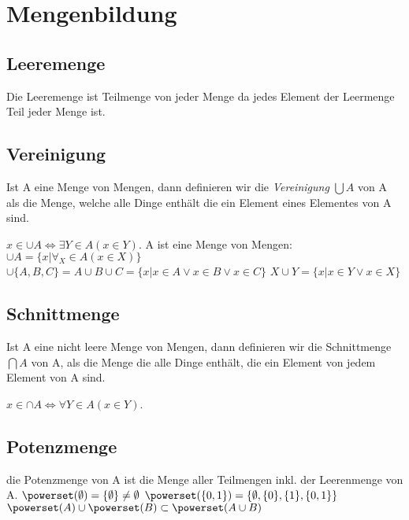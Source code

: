 \section{Mengenbildung}
\subsection{Leeremenge}
Die Leeremenge ist Teilmenge von jeder Menge da jedes Element der Leermenge Teil jeder Menge ist.
\subsection{Vereinigung}
Ist A eine Menge von Mengen, dann definieren wir die \emph{Vereinigung} \( \bigcup A\) von A als die Menge, welche alle Dinge enthält die ein Element eines Elementes von A sind.
\par \hspace*{10mm} \( x \in \cup A \Leftrightarrow \exists Y \in A(x \in Y) \).
\newline A ist eine Menge von Mengen: \newline
\hspace*{10mm}\( \cup A = \{x | \forall_X \in A (x \in X)\}\) \newline
\hspace*{10mm}\( \cup \{A, B, C\} = A \cup B \cup C = \{x|x \in A \vee x \in B \vee x \in C\}\) \newline
\hspace*{10mm}\( X \cup Y = \{ x | x \in Y \vee x \in X \}\)
\subsection{Schnittmenge}
Ist A eine nicht leere Menge von Mengen, dann definieren wir die Schnittmenge \(\bigcap A\) von A, als die Menge die alle Dinge enthält, die ein Element von jedem Element von A sind.
\par \hspace*{10mm} \( x \in \cap A \Leftrightarrow \forall Y \in A(x \in Y) \).
\subsection{Potenzmenge}
die Potenzmenge von A ist die Menge aller Teilmengen inkl. der Leerenmenge von A. \newline
\( \powerset(\emptyset) = \{\emptyset\} \neq \emptyset \) \newline
\( \powerset(\{0, 1\}) = \{\emptyset, \{0\}, \{1\}, \{0,1\}\} \) \newline
\( \powerset(A) \cup \powerset(B) \subset \powerset(A\cup B) \)
